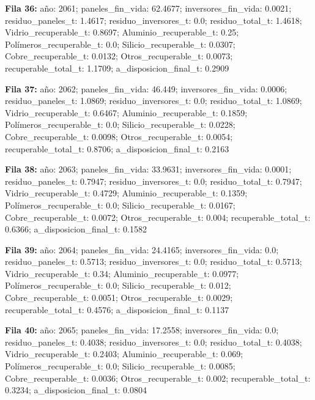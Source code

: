 {\footnotesize\textbf{Fila 36:} año: 2061; paneles\_fin\_vida: 62.4677; inversores\_fin\_vida: 0.0021; residuo\_paneles\_t: 1.4617; residuo\_inversores\_t: 0.0; residuo\_total\_t: 1.4618; Vidrio\_recuperable\_t: 0.8697; Aluminio\_recuperable\_t: 0.25; Polímeros\_recuperable\_t: 0.0; Silicio\_recuperable\_t: 0.0307; Cobre\_recuperable\_t: 0.0132; Otros\_recuperable\_t: 0.0073; recuperable\_total\_t: 1.1709; a\_disposicion\_final\_t: 0.2909\par}
{\footnotesize\textbf{Fila 37:} año: 2062; paneles\_fin\_vida: 46.449; inversores\_fin\_vida: 0.0006; residuo\_paneles\_t: 1.0869; residuo\_inversores\_t: 0.0; residuo\_total\_t: 1.0869; Vidrio\_recuperable\_t: 0.6467; Aluminio\_recuperable\_t: 0.1859; Polímeros\_recuperable\_t: 0.0; Silicio\_recuperable\_t: 0.0228; Cobre\_recuperable\_t: 0.0098; Otros\_recuperable\_t: 0.0054; recuperable\_total\_t: 0.8706; a\_disposicion\_final\_t: 0.2163\par}
{\footnotesize\textbf{Fila 38:} año: 2063; paneles\_fin\_vida: 33.9631; inversores\_fin\_vida: 0.0001; residuo\_paneles\_t: 0.7947; residuo\_inversores\_t: 0.0; residuo\_total\_t: 0.7947; Vidrio\_recuperable\_t: 0.4729; Aluminio\_recuperable\_t: 0.1359; Polímeros\_recuperable\_t: 0.0; Silicio\_recuperable\_t: 0.0167; Cobre\_recuperable\_t: 0.0072; Otros\_recuperable\_t: 0.004; recuperable\_total\_t: 0.6366; a\_disposicion\_final\_t: 0.1582\par}
{\footnotesize\textbf{Fila 39:} año: 2064; paneles\_fin\_vida: 24.4165; inversores\_fin\_vida: 0.0; residuo\_paneles\_t: 0.5713; residuo\_inversores\_t: 0.0; residuo\_total\_t: 0.5713; Vidrio\_recuperable\_t: 0.34; Aluminio\_recuperable\_t: 0.0977; Polímeros\_recuperable\_t: 0.0; Silicio\_recuperable\_t: 0.012; Cobre\_recuperable\_t: 0.0051; Otros\_recuperable\_t: 0.0029; recuperable\_total\_t: 0.4576; a\_disposicion\_final\_t: 0.1137\par}
{\footnotesize\textbf{Fila 40:} año: 2065; paneles\_fin\_vida: 17.2558; inversores\_fin\_vida: 0.0; residuo\_paneles\_t: 0.4038; residuo\_inversores\_t: 0.0; residuo\_total\_t: 0.4038; Vidrio\_recuperable\_t: 0.2403; Aluminio\_recuperable\_t: 0.069; Polímeros\_recuperable\_t: 0.0; Silicio\_recuperable\_t: 0.0085; Cobre\_recuperable\_t: 0.0036; Otros\_recuperable\_t: 0.002; recuperable\_total\_t: 0.3234; a\_disposicion\_final\_t: 0.0804\par}
